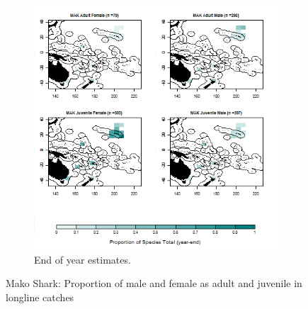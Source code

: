\documentclass[12pt]{SCreport}
\begin{document}
\begin{landscape}
\begin{figure}
\begin{subfigure}[b]{0.6\textwidth}
       \includegraphics[width=\textwidth]{../GRAPHICS/Defined/BI_25_Map_maturity_sex_MAK}
       \caption{End of year estimates.}
       \label{fig:test2}
   \end{subfigure}
\caption{Mako Shark: Proportion of male and female as adult and juvenile in longline catches }
\label{fig:test} 
\end{figure}
\end{landscape}
\end{document}
